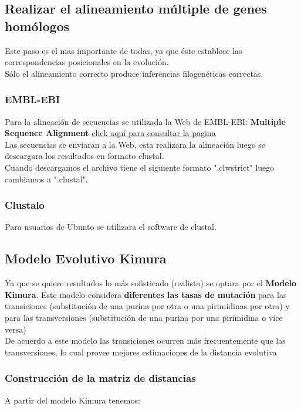 \documentclass[a4paper]{article}
\begin{document}
\subsection{Realizar el alineamiento múltiple de genes homólogos}
Este paso es el mas importante de todas, ya que éste establece las correspondencias posicionales en la evolución.\\
Sólo el alineamiento correcto produce inferencias filogenéticas
correctas.
\subsubsection*{EMBL-EBI}
Para la alineación de secuencias se utilizada la Web de EMBL-EBI: \textbf{Multiple Sequence Alignment} 
\href{https://www.ebi.ac.uk/Tools/msa/muscle/}{\underline{click aquí para consultar la pagina}}
\\
Las secuencias se enviaran a la Web, esta realizara la alineación luego se descargara los resultados en formato clustal.
\\
Cuando descargamos el archivo tiene el siguiente formato ".clwstrict" luego cambiamos a ".clustal".

\subsubsection*{Clustalo}
Para usuarios de Ubunto se utilizara el software de clustal.

\subsection{Modelo Evolutivo Kimura}
Ya que se quiere resultados lo más sofisticado (realista) se optara por el \textbf{Modelo Kimura}.
Este modelo considera \textbf{diferentes las tasas de mutación} para las transiciones (substitución de una purina por otra o una pirimidinas por otra) y para las transversiones (substitución de una purina por una pirimidina o vice versa)\\

De acuerdo a este modelo las transiciones ocurren más frecuentemente que las transversiones, lo cual provee mejores estimaciones de la distancia evolutiva


\subsubsection{Construcción de la matriz de distancias}
A partir del modelo Kimura tenemos:\\
\end{document}
